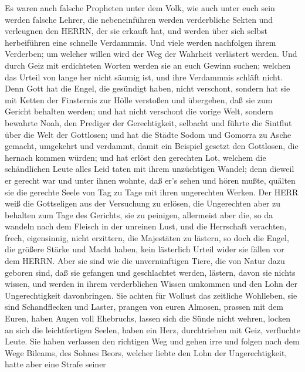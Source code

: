  Es waren auch falsche Propheten unter dem Volk, wie auch
unter euch sein werden falsche Lehrer, die nebeneinführen werden
verderbliche Sekten und verleugnen den HERRN, der sie erkauft hat, und
werden über sich selbst herbeiführen eine schnelle Verdammnis.
 Und viele werden nachfolgen ihrem Verderben; um welcher
willen wird der Weg der Wahrheit verlästert werden.  Und
durch Geiz mit erdichteten Worten werden sie an euch Gewinn suchen;
welchen das Urteil von lange her nicht säumig ist, und ihre Verdammnis
schläft nicht.  Denn Gott hat die Engel, die gesündigt
haben, nicht verschont, sondern hat sie mit Ketten der Finsternis zur
Hölle verstoßen und übergeben, daß sie zum Gericht behalten werden;
 und hat nicht verschont die vorige Welt, sondern bewahrte
Noah, den Prediger der Gerechtigkeit, selbacht und führte die Sintflut
über die Welt der Gottlosen;  und hat die Städte Sodom und
Gomorra zu Asche gemacht, umgekehrt und verdammt, damit ein Beispiel
gesetzt den Gottlosen, die hernach kommen würden;  und hat
erlöst den gerechten Lot, welchem die schändlichen Leute alles Leid
taten mit ihrem unzüchtigen Wandel;  denn dieweil er gerecht
war und unter ihnen wohnte, daß er's sehen und hören mußte, quälten sie
die gerechte Seele von Tag zu Tage mit ihren ungerechten Werken.
 Der HERR weiß die Gottseligen aus der Versuchung zu
erlösen, die Ungerechten aber zu behalten zum Tage des Gerichts, sie zu
peinigen,  allermeist aber die, so da wandeln nach dem
Fleisch in der unreinen Lust, und die Herrschaft verachten, frech,
eigensinnig, nicht erzittern, die Majestäten zu lästern, 
so doch die Engel, die größere Stärke und Macht haben, kein lästerlich
Urteil wider sie fällen vor dem HERRN.  Aber sie sind wie
die unvernünftigen Tiere, die von Natur dazu geboren sind, daß sie
gefangen und geschlachtet werden, lästern, davon sie nichts wissen, und
werden in ihrem verderblichen Wissen umkommen  und den Lohn
der Ungerechtigkeit davonbringen. Sie achten für Wollust das zeitliche
Wohlleben, sie sind Schandflecken und Laster, prangen von euren Almosen,
prassen mit dem Euren,  haben Augen voll Ehebruchs, lassen
sich die Sünde nicht wehren, locken an sich die leichtfertigen Seelen,
haben ein Herz, durchtrieben mit Geiz, verfluchte Leute. 
Sie haben verlassen den richtigen Weg und gehen irre und folgen nach dem
Wege Bileams, des Sohnes Beors, welcher liebte den Lohn der
Ungerechtigkeit,  hatte aber eine Strafe seiner
